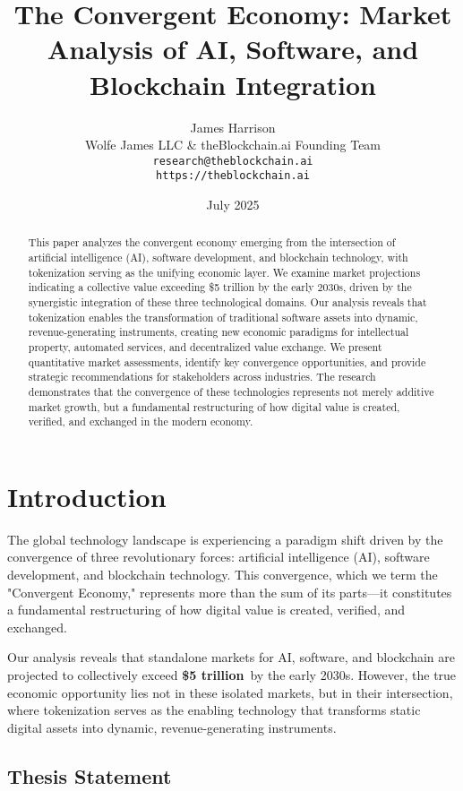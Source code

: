 \documentclass[11pt]{article}
\title{The Convergent Economy: Market Analysis of AI, Software, and Blockchain Integration}
\author{James Harrison\\
        Wolfe James LLC \& theBlockchain.ai Founding Team\\
        \texttt{research@theblockchain.ai}\\
        \texttt{https://theblockchain.ai}}
\date{July 2025}
\newcommand{\marketvalue}[2]{\textcolor{accentgreen}{\textbf{\$#1}}\,\textcolor{darkgray}{#2}}
\begin{document}
\maketitle

\begin{abstract}
This paper analyzes the convergent economy emerging from the intersection of artificial intelligence (AI), software development, and blockchain technology, with tokenization serving as the unifying economic layer. We examine market projections indicating a collective value exceeding \$5 trillion by the early 2030s, driven by the synergistic integration of these three technological domains. Our analysis reveals that tokenization enables the transformation of traditional software assets into dynamic, revenue-generating instruments, creating new economic paradigms for intellectual property, automated services, and decentralized value exchange. We present quantitative market assessments, identify key convergence opportunities, and provide strategic recommendations for stakeholders across industries. The research demonstrates that the convergence of these technologies represents not merely additive market growth, but a fundamental restructuring of how digital value is created, verified, and exchanged in the modern economy.
\end{abstract}

\section{Introduction}

The global technology landscape is experiencing a paradigm shift driven by the convergence of three revolutionary forces: artificial intelligence (AI), software development, and blockchain technology. This convergence, which we term the "Convergent Economy," represents more than the sum of its parts---it constitutes a fundamental restructuring of how digital value is created, verified, and exchanged.

Our analysis reveals that standalone markets for AI, software, and blockchain are projected to collectively exceed \marketvalue{5 trillion}{} by the early 2030s. However, the true economic opportunity lies not in these isolated markets, but in their intersection, where tokenization serves as the enabling technology that transforms static digital assets into dynamic, revenue-generating instruments.

\subsection{Thesis Statement}
\end{document}
